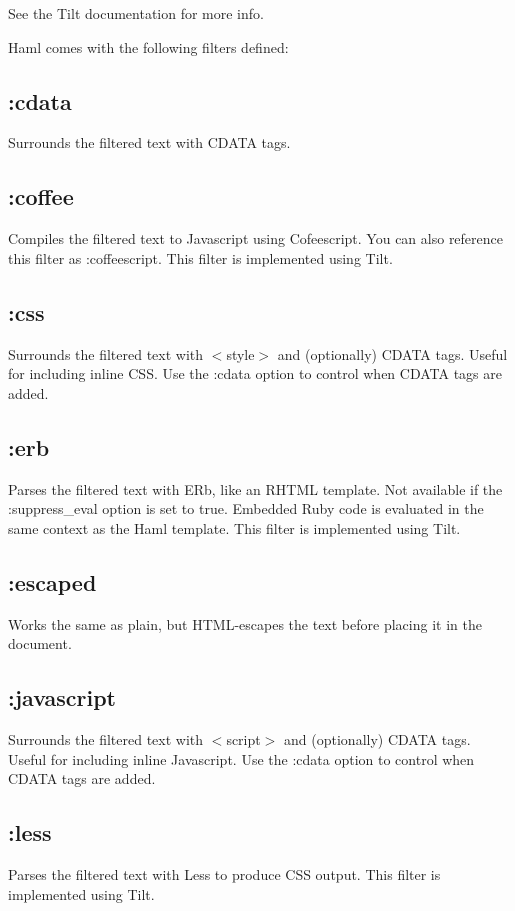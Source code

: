 \documentclass[9pt]{article}
\begin{document}
 See the Tilt documentation for more info.


 Haml comes with the following filters defined:
\subsection{:cdata}


 Surrounds the filtered text with CDATA tags.
\subsection{:coffee}


 Compiles the filtered text to Javascript using Cofeescript. You can also reference this filter as :coffeescript. This filter is implemented using Tilt.
\subsection{:css}


 Surrounds the filtered text with $<$style$>$ and (optionally) CDATA tags. Useful for including inline CSS. Use the :cdata option to control when CDATA tags are added.
\subsection{:erb}


 Parses the filtered text with ERb, like an RHTML template. Not available if the :suppress\_eval option is set to true. Embedded Ruby code is evaluated in the same context as the Haml template. This filter is implemented using Tilt.
\subsection{:escaped}


 Works the same as plain, but HTML-escapes the text before placing it in the document.
\subsection{:javascript}


 Surrounds the filtered text with $<$script$>$ and (optionally) CDATA tags. Useful for including inline Javascript. Use the :cdata option to control when CDATA tags are added.
\subsection{:less}


 Parses the filtered text with Less to produce CSS output. This filter is implemented using Tilt.
\end{document}
